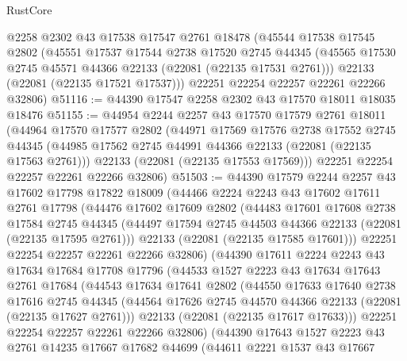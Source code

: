 \begin{lexlean}{RustCore}
\begin{coremodule}
    @2258
    @2302
    @43
    @17538
    @17547
    @2761
    @18478
    (@45544
      @17538
      @17545
      @2802
      (@45551
        @17537
        @17544
        @2738
        @17520
        @2745
        @44345
        (@45565 @17530 @2745 @45571 @44366 @22133 (@22081 (@22135 @17531 @2761)))
        @22133
        (@22081 (@22135 @17521 @17537)))
      @22251
      @22254
      @22257
      @22261
      @22266
      @32806)
@51116 := @44390 @17547 @2258 @2302 @43 @17570 @18011 @18035 @18476
@51155 := @44954
    @2244
    @2257
    @43
    @17570
    @17579
    @2761
    @18011
    (@44964
      @17570
      @17577
      @2802
      (@44971
        @17569
        @17576
        @2738
        @17552
        @2745
        @44345
        (@44985 @17562 @2745 @44991 @44366 @22133 (@22081 (@22135 @17563 @2761)))
        @22133
        (@22081 (@22135 @17553 @17569)))
      @22251
      @22254
      @22257
      @22261
      @22266
      @32806)
@51503 := @44390
    @17579
    @2244
    @2257
    @43
    @17602
    @17798
    @17822
    @18009
    (@44466
      @2224
      @2243
      @43
      @17602
      @17611
      @2761
      @17798
      (@44476
        @17602
        @17609
        @2802
        (@44483
          @17601
          @17608
          @2738
          @17584
          @2745
          @44345
          (@44497 @17594 @2745 @44503 @44366 @22133 (@22081 (@22135 @17595 @2761)))
          @22133
          (@22081 (@22135 @17585 @17601)))
        @22251
        @22254
        @22257
        @22261
        @22266
        @32806)
      (@44390
        @17611
        @2224
        @2243
        @43
        @17634
        @17684
        @17708
        @17796
        (@44533
          @1527
          @2223
          @43
          @17634
          @17643
          @2761
          @17684
          (@44543
            @17634
            @17641
            @2802
            (@44550
              @17633
              @17640
              @2738
              @17616
              @2745
              @44345
              (@44564 @17626 @2745 @44570 @44366 @22133 (@22081 (@22135 @17627 @2761)))
              @22133
              (@22081 (@22135 @17617 @17633)))
            @22251
            @22254
            @22257
            @22261
            @22266
            @32806)
          (@44390
            @17643
            @1527
            @2223
            @43
            @2761
            @14235
            @17667
            @17682
            @44699
            (@44611
              @2221
              @1537
              @43
              @17667

\end{coremodule}
\end{lexlean}
